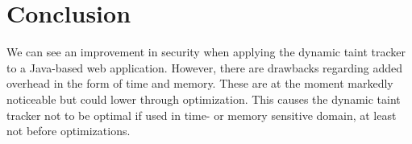 \chapter{Conclusion}

We can see an improvement in security when applying the dynamic taint tracker to a Java-based web application. However, there are drawbacks regarding added overhead in the form of time and memory. These are at the moment markedly noticeable but could lower through optimization. This causes the dynamic taint tracker not to be optimal if used in time- or memory sensitive domain, at least not before optimizations.
